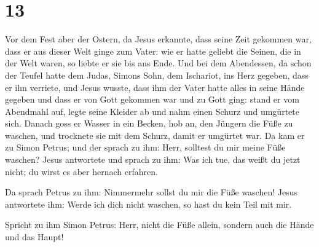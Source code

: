 \hypertarget{section-12}{%
\section{13}\label{section-12}}

 Vor dem Fest aber der Ostern, da Jesus erkannte, dass
seine Zeit gekommen war, dass er aus dieser Welt ginge zum Vater: wie er
hatte geliebt die Seinen, die in der Welt waren, so liebte er sie bis
ans Ende.  Und bei dem Abendessen, da schon der Teufel
hatte dem Judas, Simons Sohn, dem Ischariot, ins Herz gegeben, dass er
ihn verriete,  und Jesus wusste, dass ihm der Vater hatte
alles in seine Hände gegeben und dass er von Gott gekommen war und zu
Gott ging:  stand er vom Abendmahl auf, legte seine
Kleider ab und nahm einen Schurz und umgürtete sich. 
Danach goss er Wasser in ein Becken, hob an, den Jüngern die Füße zu
waschen, und trocknete sie mit dem Schurz, damit er umgürtet war.
 Da kam er zu Simon Petrus; und der sprach zu ihm: Herr,
solltest du mir meine Füße waschen?  Jesus antwortete und
sprach zu ihm: Was ich tue, das weißt du jetzt nicht; du wirst es aber
hernach erfahren.

 Da sprach Petrus zu ihm: Nimmermehr sollst du mir die
Füße waschen! Jesus antwortete ihm: Werde ich dich nicht waschen, so
hast du kein Teil mit mir.

 Spricht zu ihm Simon Petrus: Herr, nicht die Füße allein,
sondern auch die Hände und das Haupt!

